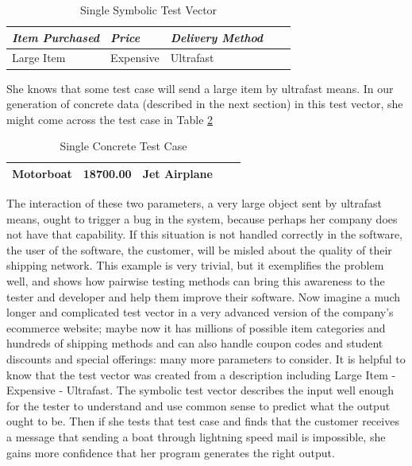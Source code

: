 \begin{table}[h!]
\centering
\begin{tabular}{@{} *5l @{}}    \toprule
\emph{Item Purchased} & \emph{Price} & \emph{Delivery Method}  \\\midrule
Large Item & Expensive & Ultrafast \\\bottomrule
 \hline
\end{tabular}
\caption{Single Symbolic Test Vector}
\label{table:testv}
\end{table}

She knows that some test case will send a large item by ultrafast means. In our generation of concrete data (described in the next section) in this test vector, she might come across the test case in Table \ref{table:conctc}

\begin{table}[h!]
\centering
\begin{tabular}{@{} *5l @{}}    \toprule
Motorboat & 18700.00 & Jet Airplane \\\bottomrule
 \hline
\end{tabular}
\caption{Single Concrete Test Case}
\label{table:conctc}
\end{table}

The interaction of these two parameters, a very large object sent by ultrafast means, ought to trigger a bug in the system, because perhaps her company does not have that capability. If this situation is not handled correctly in the software, the user of the software, the customer, will be misled about the quality of their shipping network. This example is very trivial, but it exemplifies the problem well, and shows how pairwise testing methods can bring this awareness to the tester and developer and help them improve their software. Now imagine a much longer and complicated test vector in a very advanced version of the company's ecommerce website; maybe now it has millions of possible item categories and hundreds of shipping methods and can also handle coupon codes and student discounts and special offerings: many more parameters to consider. It is helpful to know that the test vector was created from a description including Large Item - Expensive - Ultrafast. The symbolic test vector describes the input well enough for the tester to understand and use common sense to predict what the output ought to be. Then if she tests that test case and finds that the customer receives a message that sending a boat through lightning speed mail is impossible, she gains more confidence that her program generates the right output.

